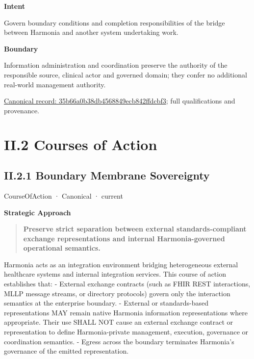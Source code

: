 \textbf{Intent}



Govern boundary conditions and completion responsibilities of the bridge between Harmonia and another system undertaking work.



\textbf{Boundary}



Information administration and coordination preserve the authority of the responsible source, clinical actor and governed domain; they confer no additional real-world management authority.


{\footnotesize \href{../../../../continuum/strategy/capability/35b66a0b38db4568849ecb842ffdcbf3.md}{Canonical record: 35b66a0b38db4568849ecb842ffdcbf3}; full qualifications and provenance.}\par
\chapter*{II.2 Courses of Action}
\label{navigation:II.2}

\section*{II.2.1 Boundary Membrane Sovereignty}
\label{navigation:II.2.1}

\label{element:25d8509146fd4f2794a17f4a5253b7a3}
{\small CourseOfAction · Canonical · current}\par

\par\medskip\textbf{Strategic Approach}\par


\begin{quote}


\textbf{Preserve strict separation between external standards-compliant exchange representations and internal Harmonia-governed operational semantics.}



\end{quote}


Harmonia acts as an integration environment bridging heterogeneous external healthcare systems and internal integration services. This course of action establishes that:
- External exchange contracts (such as FHIR REST interactions, MLLP message streams, or directory protocols) govern only the interaction semantics at the enterprise boundary.
- External or standards-based representations MAY remain native Harmonia information representations where appropriate. Their use SHALL NOT cause an external exchange contract or representation to define Harmonia-private management, execution, governance or coordination semantics.
- Egress across the boundary terminates Harmonia's governance of the emitted representation.



